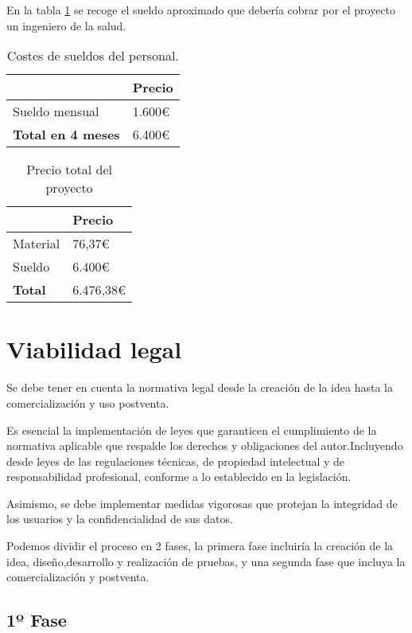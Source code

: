En la tabla \ref{tab:costes_personal} se recoge el sueldo aproximado que debería cobrar por el proyecto un ingeniero de la salud.

\begin{table}[]
\centering
\begin{tabular}{|l|l|}
\hline
\rowcolor[HTML]{BFBFBF} 
\textbf{} & \textbf{Precio} \\ \hline
Sueldo mensual & 1.600€ \\ \hline
\textbf{Total en 4 meses }& 6.400€ \\ \hline
\end{tabular}
\caption{Costes de sueldos del personal.}
\label{tab:costes_personal}
\end{table}

\begin{table}[]
\centering
\begin{tabular}{|l|l|}
\hline
\rowcolor[HTML]{BFBFBF} 
\textbf{} & \textbf{Precio} \\ \hline
Material & 76,37€ \\ \hline
Sueldo  &  6.400€ \\ \hline
\textbf{Total }& 6.476,38€ \\ \hline
\end{tabular}
\caption{Precio total del proyecto}
\label{tab:Costes Totales}
\end{table}

\section{Viabilidad legal}
Se debe tener en cuenta la normativa legal desde la creación de la idea hasta la comercialización y uso postventa.

Es esencial la implementación de leyes que garanticen el cumplimiento de la normativa aplicable que respalde los derechos y obligaciones del autor.Incluyendo desde leyes de las regulaciones técnicas, de propiedad intelectual y de responsabilidad profesional, conforme a lo establecido en la legislación.

Asimismo, se debe implementar medidas vigorosas que protejan la integridad de los usuarios y la confidencialidad de sus datos. 

Podemos dividir el proceso en 2 fases, la primera fase incluiría la creación de la idea, diseño,desarrollo y realización de pruebas, y una segunda fase que incluya la comercialización y postventa.

\subsection{1º Fase}

